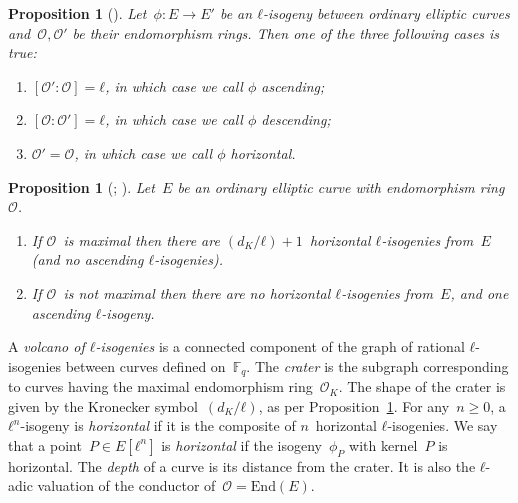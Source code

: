 \documentclass{lms}
\newtheorem{prop}[thm]{Proposition}
\begin{document}
\begin{prop}[{\cite[Proposition~21]{Kohel}}] \label{prop:isogeny-asc-desc}
Let~$ϕ: E → E'$ be an $ℓ$-isogeny between ordinary elliptic curves
and~$\mathcal O, \mathcal O'$ be their endomorphism rings.
Then one of the three following cases is true:
\begin{enumerate}
\item $[\mathcal O':\mathcal O] = ℓ$,
in which case we call $ϕ$ \emph{ascending};
\item $[\mathcal O:\mathcal O'] = ℓ$,
in which case we call $ϕ$ \emph{descending};
\item $\mathcal O' = \mathcal O$,
in which case we call $ϕ$ \emph{horizontal}.
\end{enumerate}
\end{prop}
\begin{prop}[{\cite[Proposition~23]{Kohel}; \cite[Lemma~6]{sutherland2013isogeny}}] \label{prop:isogeny-count}
Let~$E$ be an ordinary elliptic curve with endomorphism ring~$\mathcal O$.
\begin{enumerate}
\item If $\mathcal O$~is maximal then
there are $(d_K/ℓ)+1$~horizontal $ℓ$-isogenies from~$E$
(and no ascending $ℓ$-isogenies).
\item If $\mathcal O$~is not maximal then
there are no horizontal $ℓ$-isogenies from~$E$,
and one ascending $ℓ$-isogeny.
\end{enumerate}
\end{prop}

A \emph{volcano of $ℓ$-isogenies} is a connected component
of the graph of rational $ℓ$-isogenies between curves defined on~$\mathbb F_q$.
The \emph{crater} is the subgraph corresponding to curves
having the maximal endomorphism ring~$\mathcal O_K$.
The shape of the crater is given by the Kronecker symbol~$(d_K/ℓ)$,
as per Proposition~\ref{prop:isogeny-count}.
For any~$n ≥ 0$, a $ℓ^n$-isogeny is \emph{horizontal}
if it is the composite of $n$~horizontal $ℓ$-isogenies.
We say that a point~$P ∈ E[ℓ^n]$ is \emph{horizontal}
if the isogeny~$ϕ_P$ with kernel~$P$ is horizontal.
The \emph{depth} of a curve is its distance from the crater.
It is also the $ℓ$-adic valuation of the conductor
of~$\mathcal O = \mathrm{End}(E)$.
\end{document}
